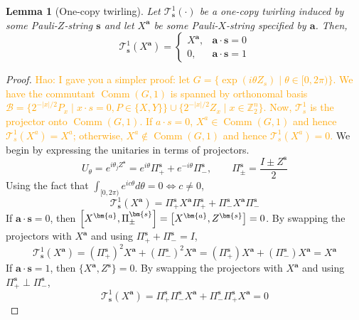 \documentclass[a4paper,onecolumn,notitlepage,nofootinbib,longbibliography,superscriptaddress, floatfix, pra, aps, 10pt]{revtex4-2}
\newcommand{\vta}{{\bm{a}}}
\newcommand{\vts}{{\bm{s}}}
\newtheorem{lemma}{Lemma}
\newcommand\hw[1]{\textcolor{orange}{Hao: #1}}
\begin{document}
\begin{lemma}[One-copy twirling] \label{lem: one_copy_twirl} Let $\mathcal{T}^1_\vts(\cdot)$ be a one-copy twirling induced by some Pauli-$Z$-string $\vts$ and let $X^\vta $ be some Pauli-$X$-string specified by $\vta$. Then,
\begin{equation}\mathcal{T}^1_\vts(X^\vta) = \begin{cases} X^\vta, & \vta \cdot \vts = 0\\
0, & \vta \cdot \vts = 1 \end{cases}
    \end{equation}
\end{lemma}
\begin{proof}
\hw{I gave you a simpler proof: let $G=\{\exp(i\theta Z_s)\;\vert\;\theta\in[0,2\pi)\}$. We have the commutant $\operatorname{Comm}(G,1)$ is spanned by orthonomal basis $\mathcal{B}=\{2^{-|x|/2}P_x\;\vert\; x\cdot s = 0, P\in \{X, Y\}\}\cup \{2^{-|x|/2}Z_x\;\vert\; x\in \mathbb{Z}_2^n\}$. Now, $\mathcal{T}^1_s$ is the projector onto $\operatorname{Comm}(G,1)$. If $a\cdot s = 0$, $X^a\in\operatorname{Comm}(G,1)$ and hence $\mathcal{T}^1_s(X^a)=X^a$; otherwise, $X^a\notin \operatorname{Comm}(G,1)$ and hence $\mathcal{T}^1_s(X^a)=0$.}
We begin by expressing the unitaries in terms of projectors.
\begin{equation}
  U_{\theta} = e^{i\theta_j Z^{\vts}} = e^{i\theta}\Pi_+^{\vts} + e^{-i\theta}\Pi_-^{\vts}, \qquad\Pi_\pm^{\vts} = \frac{I\pm Z^{\vts}}{2}
\end{equation}
Using the fact that $\int_{[0,2\pi)} e^{i c\theta} d \theta = 0 \iff c\neq 0$,
\begin{equation}
    \mathcal{T}^1_{\vts}(X^\vta) = \Pi_+^{\vts} X^\vta \Pi_+^{\vts} + \Pi_-^{\vts} X^\vta \Pi_-^{\vts} 
\end{equation}
If $\vta \cdot \vts = 0$, then $\comm{X^\vta}{\Pi_\pm^{\vts}} = \comm{X^\vta}{Z^\vts} = 0$. By swapping the projectors with $X^\vta$ and using $\Pi_+^{\vts} + \Pi_-^{\vts} = I$,
\begin{equation}
    \mathcal{T}^1_{\vts}(X^\vta) = (\Pi_+^{\vts})^2X^\vta + (\Pi_-^{\vts})^2 X^\vta  = (\Pi_+^{\vts})X^\vta + (\Pi_-^{\vts}) X^\vta  = X^\vta
    \end{equation}
If $\vta \cdot \vts = 1$, then $\{X^\vta, Z^\vts\} = 0$. By swapping the projectors with $X^\vta$ and using $\Pi_+^{\vts} \perp \Pi_-^{\vts}$,
\begin{equation}
    \mathcal{T}^1_{\vts}(X^\vta) = \Pi_+^{\vts}\Pi_-^{\vts} X^\vta + \Pi_-^{\vts}\Pi_+^{\vts} X^\vta
    = 0 
\end{equation}
\end{proof}
\end{document}
